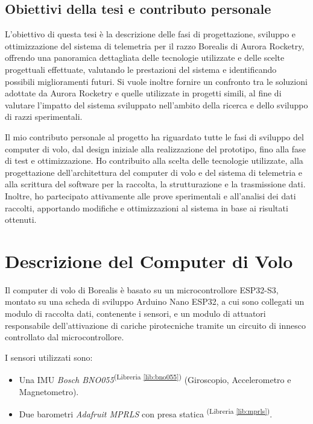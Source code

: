 \documentclass[12pt,a4paper,twoside]{book}
\newcommand{\libref}[1]{\textsuperscript{(Libreria \ref{#1})}}
\begin{document}
\section{Obiettivi della tesi e contributo personale}
L'obiettivo di questa tesi è la descrizione delle fasi di progettazione,
sviluppo e ottimizzazione del sistema di telemetria per il razzo Borealis di
Aurora Rocketry, offrendo una panoramica dettagliata delle tecnologie utilizzate
e delle scelte progettuali effettuate, valutando le prestazioni del sistema e
identificando possibili miglioramenti futuri.
Si vuole inoltre fornire un confronto tra le soluzioni adottate da Aurora
Rocketry e quelle utilizzate in progetti simili, al fine di valutare l'impatto
del sistema sviluppato nell'ambito della ricerca e dello sviluppo di razzi
sperimentali.

Il mio contributo personale al progetto ha riguardato tutte le fasi di sviluppo
del computer di volo, dal design iniziale alla realizzazione del prototipo, fino
alla fase di test e ottimizzazione.
Ho contribuito alla scelta delle tecnologie utilizzate, alla progettazione
dell'architettura del computer di volo e del sistema di telemetria e alla
scrittura del software per la raccolta, la strutturazione e la trasmissione dati.
Inoltre, ho partecipato attivamente alle prove sperimentali e all'analisi dei
dati raccolti, apportando modifiche e ottimizzazioni al sistema in base ai
risultati ottenuti.

\chapter{Descrizione del Computer di Volo} \label{chap:flight-computer}
\pagestyle{plain}

Il computer di volo di Borealis è basato su un microcontrollore ESP32-S3, montato
su una scheda di sviluppo Arduino Nano ESP32, a cui sono collegati un modulo di 
raccolta dati, contenente i sensori, e un modulo di attuatori responsabile 
dell'attivazione di cariche pirotecniche tramite un circuito di innesco 
controllato dal microcontrollore.%

I sensori utilizzati sono:
\begin{itemize}
    \item Una \ac{IMU} \emph{Bosch BNO055}\libref{lib:bno055}
          (Giroscopio, Accelerometro e Magnetometro).
    \item Due barometri \emph{Adafruit MPRLS} con presa statica \libref{lib:mprls}.
\end{itemize}
\end{document}
